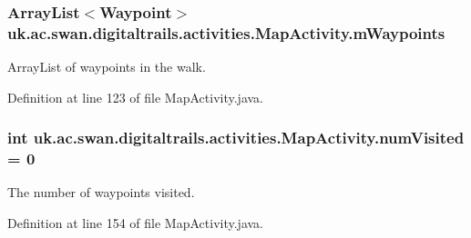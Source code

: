 \hypertarget{classuk_1_1ac_1_1swan_1_1digitaltrails_1_1activities_1_1_map_activity_ae044f1c724b13a91aebfe131f341afe2}{
\subsubsection[{m\+Waypoints}]{\setlength{\rightskip}{0pt plus 5cm}Array\+List$<${\bf Waypoint}$>$ uk.\+ac.\+swan.\+digitaltrails.\+activities.\+Map\+Activity.\+m\+Waypoints\hspace{0.3cm}{\ttfamily [private]}}}\label{classuk_1_1ac_1_1swan_1_1digitaltrails_1_1activities_1_1_map_activity_ae044f1c724b13a91aebfe131f341afe2}


Array\+List of waypoints in the walk. 



Definition at line 123 of file Map\+Activity.\+java.

\hypertarget{classuk_1_1ac_1_1swan_1_1digitaltrails_1_1activities_1_1_map_activity_ae020582911fb809909208122f56d13e2}{
\subsubsection[{num\+Visited}]{\setlength{\rightskip}{0pt plus 5cm}int uk.\+ac.\+swan.\+digitaltrails.\+activities.\+Map\+Activity.\+num\+Visited = 0\hspace{0.3cm}{\ttfamily [private]}}}\label{classuk_1_1ac_1_1swan_1_1digitaltrails_1_1activities_1_1_map_activity_ae020582911fb809909208122f56d13e2}


The number of waypoints visited. 



Definition at line 154 of file Map\+Activity.\+java.

